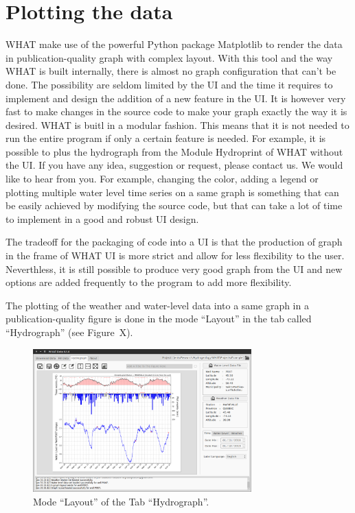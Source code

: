 \documentclass[WHATMANUAL.tex]{subfiles}
\begin{document}
\chapter{Plotting the data}\label{chap:plotting_data}

WHAT make use of the powerful Python package Matplotlib to render the data in publication-quality graph with complex layout. With this tool and the way WHAT is built internally, there is almost no graph configuration that can't be done. The possibility are seldom limited by the UI and the time it requires to implement and design the addition of a new feature in the UI. It is however very fast to make changes in the source code to make your graph exactly the way it is desired. WHAT is buitl in a modular fashion. This means that it is not needed to run the entire program if only a certain feature is needed. For example, it is possible to plus the hydrograph from the Module Hydroprint of WHAT without the UI. If you have any idea, suggestion or request, please contact us. We would like to hear from you. For example, changing the color, adding a legend or plotting multiple water level time series on a same graph is something that can be easily achieved by modifying the source code, but that can take a lot of time to implement in a good and robust UI design.

The tradeoff for the packaging of code into a UI is that the production of graph in the frame of WHAT UI is more strict and allow for less flexibility to the user. Neverthless, it is still possible to produce very good graph from the UI and new options are added frequently to the program to add more flexibility.

The plotting of the weather and water-level data into a same graph in a publication-quality figure is done in the mode ``Layout'' in the tab called ``Hydrograph'' (see Figure~X).

\begin{figure}[h!]
\centering
\includegraphics[width=0.75\textwidth]{img/WHAT_Screenshot002}
\caption[Mode ``Layout'' of the Tab ``Hydrograph'']{Mode ``Layout'' of the Tab ``Hydrograph''.}
\label{fig:tab_hydrograph_layout}
\end{figure}
\end{document}
